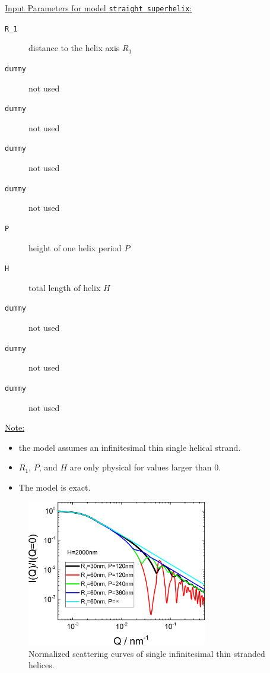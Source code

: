\vspace{5mm}

\uline{Input Parameters for model \texttt{straight superhelix}:}\\
\begin{description}
\item[\texttt{R\_1}] distance to the helix axis $R_1$
\item[\texttt{dummy}] not used
\item[\texttt{dummy}] not used
\item[\texttt{dummy}] not used
\item[\texttt{dummy}] not used
\item[\texttt{P}] height of one helix period $P$
\item[\texttt{H}] total length of helix $H$
\item[\texttt{dummy}] not used
\item[\texttt{dummy}] not used
\item[\texttt{dummy}] not used
\end{description}

\noindent\uline{Note:}
\begin{itemize}
\item the model assumes an infinitesimal thin single helical strand.
\item $R_1$, $P$, and $H$ are only physical for values larger than 0.
\item The model is exact.
\end{itemize}

\begin{figure}[htb]
\begin{center}
\includegraphics[width=0.7\textwidth]{../images/form_factor/cylindrical_obj/helix_straightIQ.png}
\end{center}
\caption{Normalized scattering curves of single infinitesimal thin stranded helices.}
\label{fig:helixstraightIQ}
\end{figure}

